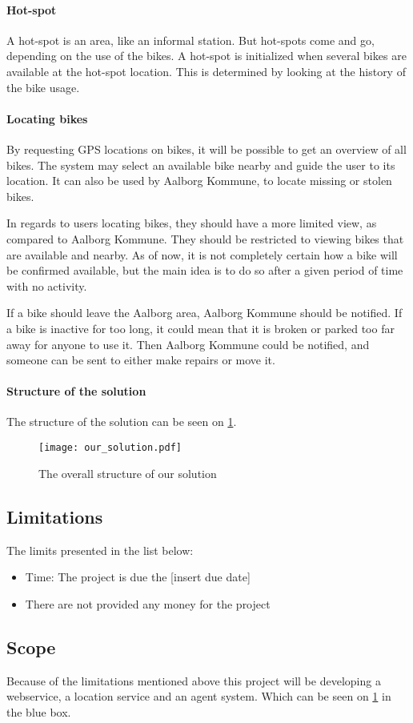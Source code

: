 \paragraph{Hot-spot}
A hot-spot is an area, like an informal station.
But hot-spots come and go, depending on the use of the bikes.
A hot-spot is initialized when several bikes are available at the hot-spot location.
This is determined by looking at the history of the bike usage.

\paragraph{Locating bikes}
By requesting GPS locations on bikes, it will be possible to get an overview of all bikes.
The system may select an available bike nearby and guide the user to its location.
It can also be used by Aalborg Kommune, to locate missing or stolen bikes.

In regards to users locating bikes, they should have a more limited view, as compared to Aalborg Kommune.
They should be restricted to viewing bikes that are available and nearby.
As of now, it is not completely certain how a bike will be confirmed available, but the main idea is to do so after a given period of time with no activity.

If a bike should leave the Aalborg area, Aalborg Kommune should be notified.
If a bike is inactive for too long, it could mean that it is broken or parked too far away for anyone to use it.
Then Aalborg Kommune could be notified, and someone can be sent to either make repairs or move it.

\paragraph{Structure of the solution}
The structure of the solution can be seen on \cref{fig:solution_structure}.

\begin{figure}
\texttt{[image: our\_solution.pdf]}
\caption{The overall structure of our solution}
\label{fig:solution_structure}
\end{figure}

\subsection{Limitations}
The limits presented in the list below:
\begin{itemize}
\item Time: The project is due the [insert due date]
\item There are not provided any money for the project
\end{itemize}

\subsection{Scope}
Because of the limitations mentioned above this project will be developing a webservice, a location service and an agent system.
Which can be seen on \cref{fig:solution_structure} in the blue box.
